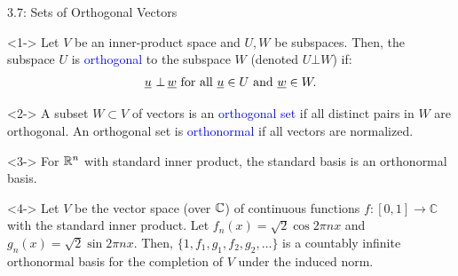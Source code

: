\documentclass[10pt,english,aspectratio=169]{beamer}
\begin{document}
\begin{frame}[shrink=5]{3.7: Sets of Orthogonal Vectors}

\vspace{-1mm}

\begin{definition}<1->
Let $V$ be an inner-product space and $U,W$ be subspaces.
Then, the subspace $U$ is \textcolor{blue}{orthogonal} to the subspace $W$ (denoted $U \bot W$) if: \vspace{-2mm}
$$ \underline{u} \ \bot \, \underline{w} \text{  for all } \underline{u}\in U \text{ and } \underline{w}\in W. $$
\end{definition}

\vspace{-1mm}

\begin{definition}<2->
A subset $W\subset V$ of vectors is an \textcolor{blue}{orthogonal set} if all distinct pairs in $W$ are orthogonal.
An orthogonal set is \textcolor{blue}{orthonormal} if all vectors are normalized.
\end{definition}

\vspace{-1mm}

\begin{example}<3->
For $\mathbb{R}^n$ with standard inner product, the standard basis is an orthonormal basis.
\end{example}

\vspace{-1mm}

\begin{example}<4->
Let $V$ be the vector space (over $\mathbb{C}$) of continuous functions $f\colon [0,1]\to\mathbb{C}$ with the standard inner product.
Let $f_n(x) = \sqrt{2} \cos 2 \pi n x$ and $g_n (x) = \sqrt{2} \sin 2 \pi n x$.
Then, $\{ 1, f_1, g_1, f_2, g_2, \ldots \}$ is a countably infinite orthonormal basis for the completion of $V$ under the induced norm.
\end{example}

\end{frame}
\end{document}
